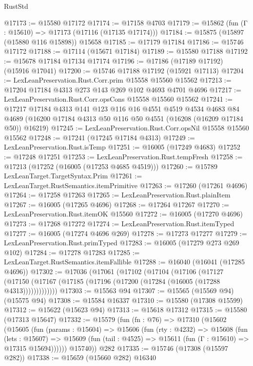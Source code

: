 \begin{lexlean}{RustStd}
\begin{coremodule}
@17173 := @15580 @17172
@17174 := @17158 @4703
@17179 := @15862 (fun (Γ : @15610) => @17173 (@17116 (@17135 @17174)))
@17184 := @15875 (@15897 (@15880 @116 @15898)) @15658
@17185 := @17179 @17184
@17186 := @15746 @17172
@17188 := @17114 (@15671 @17184)
@17189 := @15580 @17188
@17192 := @15678 @17184 @17134 @17174
@17196 := @17186 (@17189 @17192) (@15916 @17041)
@17200 := @15746 @17188 @17192 (@15921 @17113)
@17204 := LexLeanPreservation.Rust.Corr.prim @15558 @15560 @15562
@17213 := @17204 @17184 @4313 @273 @143 @269 @102 @4693 @4701 @4696
@17217 := LexLeanPreservation.Rust.Corr.opsCons @15558 @15560 @15562
@17241 := @17217
    @17184
    @4313
    @141
    @123
    @116
    @16
    @4551
    @4519
    @4534
    @4683
    @84
    @4689
    (@16200 @17184 @4313 @50 @116 @50 @4551 (@16208 (@16209 @17184 @50)) @16219)
@17245 := LexLeanPreservation.Rust.Corr.opsNil @15558 @15560 @15562
@17248 := @17241 (@17245 @17184 @4313)
@17249 := LexLeanPreservation.Rust.isTemp
@17251 := @16005 (@17249 @4683)
@17252 := @17248 @17251
@17253 := LexLeanPreservation.Rust.tempFresh
@17258 := @17213 (@17252 (@16005 (@17253 @4685 @4519)))
@17260 := @15789 LexLeanTarget.TargetSyntax.Prim
@17261 := LexLeanTarget.RustSemantics.itemPrimitive
@17263 := @17260 (@17261 @4696)
@17264 := @17258 @17263
@17265 := LexLeanPreservation.Rust.plainItem
@17267 := @16005 (@17265 @4696)
@17268 := @17264 @17267
@17270 := LexLeanPreservation.Rust.itemOK @15560
@17272 := @16005 (@17270 @4696)
@17273 := @17268 @17272
@17274 := LexLeanPreservation.Rust.itemTyped
@17277 := @16005 (@17274 @4696 @269)
@17278 := @17273 @17277
@17279 := LexLeanPreservation.Rust.primTyped
@17283 := @16005 (@17279 @273 @269 @102)
@17284 := @17278 @17283
@17285 := LexLeanTarget.RustSemantics.itemFallible
@17288 := @16040 (@16041 (@17285 @4696))
@17302 := @17036
    (@17061
      (@17102
        (@17104
          (@17106
            (@17127
              (@17150 (@17167 (@17185 (@17196 (@17200 (@17284 (@16005 (@17288 @4313)))))))))))))
@17303 := @15563 @94
@17307 := @15565 (@15569 @94) (@15575 @94)
@17308 := @15584 @16337
@17310 := @15580 (@17308 @15599)
@17312 := @15622 (@15623 @94)
@17313 := @15618 @17312
@17315 := @15580 (@17313 @15647)
@17332 := @15579
    (fun (fn : @76) =>
    @17310
      (@15602
        (@15605
          (fun (params : @15604) =>
          @15606
            (fun (rty : @4232) =>
            @15608
              (fun (lets : @15607) =>
              @15609 (fun (tail : @4525) => @15611 (fun (Γ : @15610) => @17315 @15694))))))
        @15740))
    @282
@17335 := @15746 (@17308 (@15597 @282))
@17338 := @15659 (@15660 @282) @16340

\end{coremodule}
\end{lexlean}
